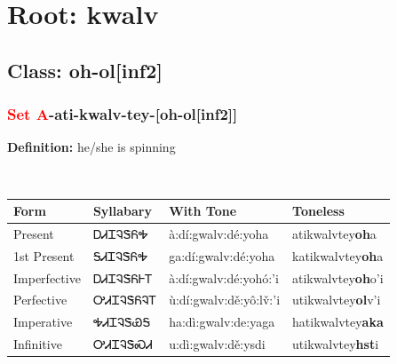 \needspace{4in}
\section*{Root: kwalv}
\nopagebreak
{}
\needspace{3in}
\subsection*{Class: oh-ol[inf2]}
\nopagebreak
\needspace{2in}
\subsubsection*{\textcolor{Red}{Set A}{-}ati{-}\textbf{kwalv}{-}tey{-}[oh-ol[inf2]]}
\nopagebreak
\textbf{Definition: } he/she is spinning
\\[0.5em]
\begin{tabularx}{\textwidth}{l X X X}%
\toprule%
\textbf{Form}&\textbf{Syllabary}&\textbf{With Tone}&\textbf{Toneless}\\%
\midrule%
Present&ᎠᏗᏆᎸᏕᏲᎭ&à:dí:gwalv:dé:yoha&atikwalvtey\textbf{oh}a\\%
1st Present&ᎦᏗᏆᎸᏕᏲᎭ&ga:dí:gwalv:dé:yoha&katikwalvtey\textbf{oh}a\\%
Imperfective&ᎠᏗᏆᎸᏕᏲᎰᎢ&à:dí:gwalv:dé:yohó:’i&atikwalvtey\textbf{oh}o'i\\%
Perfective&ᎤᏗᏆᎸᏕᏲᎸᎢ&ù:dí:gwalv:dě:yô:lv̌:’i&utikwalvtey\textbf{ol}v'i\\%
Imperative&ᎭᏗᏆᎸᏕᏯᎦ&ha:dì:gwalv:de:yaga&hatikwalvtey\textbf{aka}\\%
Infinitive&ᎤᏗᏆᎸᏕᏍᏗ&u:dì:gwalv:dě:ysdi&utikwalvtey\textbf{hst}i\\%
\bottomrule%
\end{tabularx}
\\[1em]